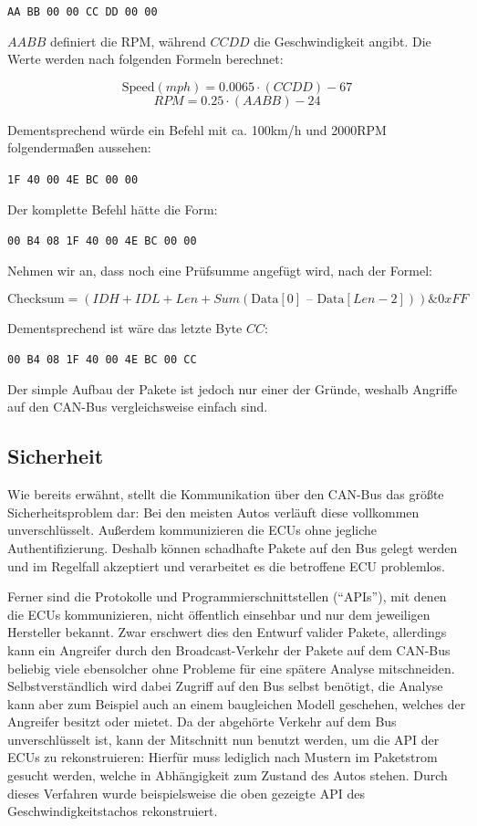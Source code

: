 \documentclass[
    fontsize=12pt,
    headings=small,
    parskip=half,           %
    bibliography=totoc,
    numbers=noenddot,       %
    open=any,               %
    ]{scrreprt}
\begin{document}
\centerline{\texttt{AA BB 00 00 CC DD 00 00}}

$AA BB$ definiert die RPM, während $CC DD$ die Geschwindigkeit angibt. Die Werte werden nach folgenden Formeln berechnet:

\[\text{Speed} (mph) = 0.0065 \cdot (CC DD) - 67\]
\[RPM = 0.25 \cdot (AA BB) - 24\]

Dementsprechend würde ein Befehl mit ca. 100km/h und 2000RPM folgendermaßen aussehen:

\centerline{\texttt{1F 40 00 4E BC 00 00}}

Der komplette Befehl hätte die Form:

\centerline{\texttt{00 B4 08 1F 40 00 4E BC 00 00}}

Nehmen wir an, dass noch eine Prüfsumme angefügt wird, nach der Formel:

\[\text{Checksum} = (IDH + IDL + Len + Sum(\text{Data}[0]\text{ – }\text{Data}[Len-2])) \& 0xFF \]

Dementsprechend ist wäre das letzte Byte $CC$:

\centerline{\texttt{00 B4 08 1F 40 00 4E BC 00 CC}}

Der simple Aufbau der Pakete ist jedoch nur einer der Gründe, weshalb Angriffe auf den CAN-Bus vergleichsweise einfach sind.

\subsection{Sicherheit}
Wie bereits erwähnt, stellt die Kommunikation über den CAN-Bus das größte Sicherheitsproblem dar: Bei den meisten Autos verläuft diese vollkommen unverschlüsselt. Außerdem kommunizieren die ECUs ohne jegliche Authentifizierung. Deshalb können schadhafte Pakete auf den Bus gelegt werden und im Regelfall akzeptiert und verarbeitet es die betroffene ECU problemlos.\par
Ferner sind die Protokolle und Programmierschnittstellen ("`APIs"'), mit denen die ECUs kommunizieren, nicht öffentlich einsehbar und nur dem jeweiligen Hersteller bekannt. Zwar erschwert dies den Entwurf valider Pakete, allerdings kann ein Angreifer durch den Broadcast-Verkehr der Pakete auf dem CAN-Bus beliebig viele ebensolcher ohne Probleme für eine spätere Analyse mitschneiden.
Selbstverständlich wird dabei Zugriff auf den Bus selbst benötigt, die Analyse kann aber zum Beispiel auch an einem baugleichen Modell geschehen, welches der Angreifer besitzt oder mietet. Da der abgehörte Verkehr auf dem Bus unverschlüsselt ist, kann der Mitschnitt nun benutzt werden, um die API der ECUs zu rekonstruieren: Hierfür muss lediglich nach Mustern im Paketstrom gesucht werden, welche in Abhängigkeit zum Zustand des Autos stehen. Durch dieses Verfahren wurde beispielsweise die oben gezeigte API des Geschwindigkeitstachos rekonstruiert.
\end{document}
